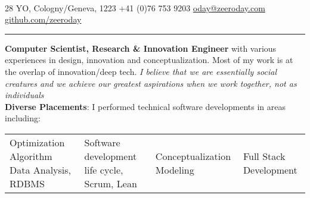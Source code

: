 \documentclass[a4paper, 10pt]{article}
\begin{document}

\begin{center}
\\
28 YO,\hfill {\small\faMapMarker} Cologny/Geneva, 1223 
\color{text1}{\large\Telefon} +41 (0)76 753 9203 
\hfill {\small\faEnvelope} \href{mailto:oday@zeeroday.com}{oday@zeeroday.com} 
\hfill \color{text1}{\large\faGithub} \href{https://github.com/zeeroday}{github.com/zeeroday}
\hfill\small{}

\rule{\textwidth}{.1pt}

\vspace{-5pt}
\begin{flushleft}
	\textbf{Computer Scientist, Research \& Innovation Engineer}  with various experiences in design, innovation and conceptualization. Most of my work is at the overlap of innovation/deep tech. \textit{I believe that we are essentially social creatures and we achieve our greatest aspirations when we work together, not as individuals}\\ \vspace{1.1mm}
\textbf{Diverse Placements}: I performed technical software developments in areas including:
\vspace{-6mm}
\end{flushleft}
\begin{tabularx}{\textwidth}{||X||X|| X|| X||}

		\rowcolor{Gray}
		Optimization Algorithm Data Analysis, RDBMS& 
		Software development life cycle, Scrum, Lean & 
		Conceptualization Modeling  & 
		Full Stack Development
\end{tabularx}

\FloatBarrier
{}
\vspace{-9mm}

\end{center}
\end{document}
